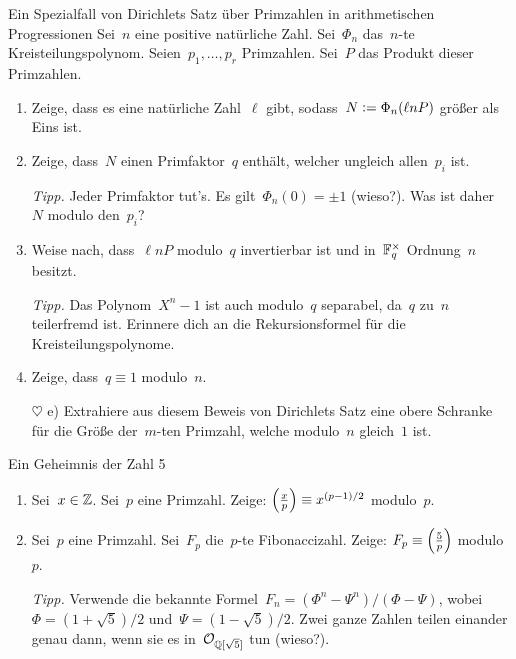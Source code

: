 \documentclass{uebblatt}
\begin{document}
\begin{aufgabe}{Ein Spezialfall von Dirichlets Satz über Primzahlen in arithmetischen
Progressionen}
Sei~$n$ eine positive natürliche Zahl. Sei~$\Phi_n$ das~$n$-te
Kreisteilungspolynom. Seien~$p_1,\ldots,p_r$ Primzahlen.
Sei~$P$ das Produkt dieser Primzahlen.
\begin{enumerate}
\item Zeige, dass es eine natürliche Zahl~$\ell$ gibt, sodass~$N \vcentcolon=
\Phi_n(\ell n P)$ größer als Eins ist.
\item Zeige, dass~$N$ einen Primfaktor~$q$ enthält, welcher ungleich
allen~$p_i$ ist.

{\tiny\emph{Tipp.} Jeder Primfaktor tut's. Es gilt~$\Phi_n(0) = \pm1$ (wieso?). Was ist daher~$N$
modulo den~$p_i$?\par}
\item Weise nach, dass~$\ell n P$ modulo~$q$ invertierbar ist und in~$\mathbb{F}_q^\times$
Ordnung~$n$ besitzt.

{\tiny\emph{Tipp.} Das Polynom~$X^n - 1$ ist auch modulo~$q$ separabel, da~$q$
zu~$n$ teilerfremd ist. Erinnere dich an die Rekursionsformel für die
Kreisteilungspolynome.\par}
\item Zeige, dass~$q \equiv 1$ modulo~$n$.
\item[$\heartsuit$ e)] Extrahiere aus diesem Beweis von Dirichlets Satz eine
obere Schranke für die Größe der~$m$-ten Primzahl, welche modulo~$n$ gleich~$1$
ist.
\end{enumerate}
\end{aufgabe}

\begin{aufgabe}{Ein Geheimnis der Zahl 5}
\begin{enumerate}
\item Sei~$x \in \mathbb{Z}$. Sei~$p$ eine Primzahl. Zeige: $\left(\frac{x}{p}\right) \equiv
x^{(p-1)/2}$ modulo~$p$.
\item Sei~$p$ eine Primzahl. Sei~$F_p$ die~$p$-te Fibonaccizahl. Zeige: $F_p
\equiv \left(\frac{5}{p}\right)$ modulo~$p$.

{\tiny\emph{Tipp.} Verwende die bekannte Formel~$F_n = (\Phi^n - \Psi^n) /
(\Phi - \Psi)$, wobei~$\Phi = (1 + \sqrt{5})/2$ und~$\Psi = (1 - \sqrt{5})/2$.
Zwei ganze Zahlen teilen einander genau dann, wenn sie es
in~$\mathcal{O}_{\mathbb{Q}[\sqrt{5}]}$ tun (wieso?).\par}
\end{enumerate}
\end{aufgabe}
\end{document}
